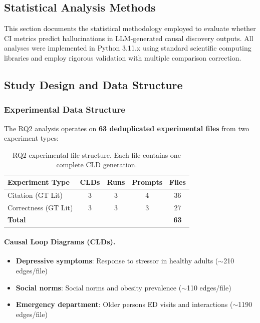 \subsection{Statistical Analysis Methods}

This section documents the statistical methodology employed to evaluate whether CI metrics predict hallucinations in LLM-generated causal discovery outputs. All analyses were implemented in Python 3.11.x using standard scientific computing libraries and employ rigorous validation with multiple comparison correction.

\subsection{Study Design and Data Structure}

\subsubsection{Experimental Data Structure}

The RQ2 analysis operates on \textbf{63 deduplicated experimental files} from two experiment types:

\begin{table}[h]
\centering
\begin{tabular}{lcccc}
\toprule
\textbf{Experiment Type} & \textbf{CLDs} & \textbf{Runs} & \textbf{Prompts} & \textbf{Files} \\
\midrule
Citation (GT Lit) & 3 & 3 & 4 & 36 \\
Correctness (GT Lit) & 3 & 3 & 3 & 27 \\
\midrule
\textbf{Total} & & & & \textbf{63} \\
\bottomrule
\end{tabular}
\caption{RQ2 experimental file structure. Each file contains one complete CLD generation.}
\label{tab:rq2_file_structure}
\end{table}

\paragraph{Causal Loop Diagrams (CLDs).}
\begin{itemize}
    \item \textbf{Depressive symptoms}: Response to stressor in healthy adults ($\sim$210 edges/file)
    \item \textbf{Social norms}: Social norms and obesity prevalence ($\sim$110 edges/file)
    \item \textbf{Emergency department}: Older persons ED visits and interactions ($\sim$1190 edges/file)
\end{itemize}


